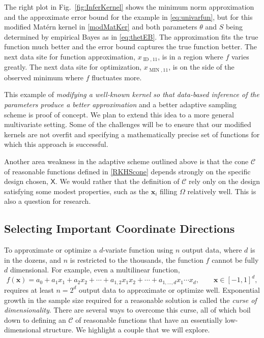 \documentclass[11pt]{NSFamsart}
\DeclareMathOperator{\MIN}{MIN}
\DeclareMathOperator{\ID}{ID}
\newcommand{\mX}{\mathsf{X}}
\newcommand{\bx}{{\boldsymbol{x}}}
\newcommand{\calc}{{\mathcal{C}}}
\begin{document}
The right plot in Fig.\ \ref{fig:InferKernel} shows the minimum norm approximation and the approximate error bound for the example in \eqref{eq:univarfun}, but for this modified Mat\'ern kernel in \eqref{modMatKer} and both parameters $\theta$ and $S$ being determined by empirical Bayes as in \eqref{eq:thetEB}.  The approximation fits the true function much better and the error bound captures the true function better.  The next data site for function approximation, $x_{\ID,11}$, is in a region where $f$ varies greatly.  The next data site for optimization, $x_{\MIN,11}$,  is on the side of the observed minimum where $f$ fluctuates more.

This example of \emph{modifying a well-known kernel so that data-based inference of the parameters produce a better approximation} and a better adaptive sampling scheme is proof of concept.  We plan to extend this idea to a more general multivariate setting.  Some of the challenges will be to ensure that our modified kernels are not overfit and specifying a mathematically precise set of functions for which this approach is successful.

Another area weakness in the adaptive scheme outlined above is that the cone $\calc$ of reasonable functions defined in  \eqref{RKHScone} depends strongly on the specific design chosen, $\mX$.  We would rather that the definition of $\calc$ rely only on the design satisfying some modest properties, such as the $\bx_i$ filling  $\Omega$ relatively well.  This is also a question for research.

\subsection{Selecting Important Coordinate Directions} \label{sec:selectCoord}

To approximate or optimize a $d$-variate function using $n$ output data, where $d$ is in the dozens, and $n$ is restricted to the thousands, the function $f$ cannot be fully $d$ dimensional.  For example, even a multilinear function,
\begin{equation*}
    f(\bx) = a_0 + a_1 x_1 + a_2 x_2 + \cdots + a_{1,2} x_1 x_2 + \cdots + a_{1,\ldots, d}x_1 \cdots x_d, \qquad \bx \in [-1,1]^d,
\end{equation*}
requires at least $n = 2^d$ output data to approximate or optimize well.  Exponential growth in the sample size required for a reasonable solution is called the \emph{curse of dimensionality}.  There are several ways to overcome this curse, all of which boil down to defining an $\calc$ of reasonable functions that have an essentially low-dimensional structure.  We highlight a couple that we will explore.
\end{document}
